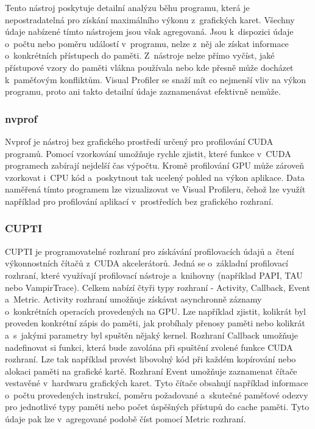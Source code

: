 Tento nástroj poskytuje detailní analýzu běhu programu, která je nepostradatelná pro získání maximálního výkonu z~grafických karet. Všechny údaje nabízené tímto nástrojem jsou však agregovaná. Jsou k~dispozici údaje o~počtu nebo poměru událostí v~programu, nelze z~něj ale získat informace o~konkrétních přístupech do paměti. Z~nástroje nelze přímo vyčíst, jaké přístupové vzory do paměti vlákna používala nebo kde přesně může docházet k~paměťovým konfliktům. 
Visual Profiler se snaží mít co nejmenší vliv na výkon programu, proto ani takto detailní údaje zaznamenávat efektivně nemůže.


\subsubsection{nvprof}
Nvprof je nástroj bez grafického prostředí určený pro profilování CUDA programů. Pomocí vzorkování umožňuje rychle zjistit, které funkce v~CUDA programech zabírají nejdelší čas výpočtu. Kromě profilování GPU může zároveň vzorkovat i~CPU kód a~poskytnout tak ucelený pohled na výkon aplikace. Data naměřená tímto programem lze vizualizovat ve Visual Profileru, čehož lze využít například pro profilování aplikací v~prostředích bez grafického rozhraní. 

\subsubsection{CUPTI}
CUPTI je programovatelné rozhraní pro získávání profilovacích údajů a~čtení výkonnostních čítačů z~CUDA akcelerátorů. Jedná se o~základní profilovací rozhraní, které využívají profilovací nástroje a~knihovny (například PAPI, TAU nebo VampirTrace).
Celkem nabízí čtyři typy rozhraní - Activity, Callback, Event a~Metric. Activity rozhraní umožňuje získávat asynchronně záznamy o~konkrétních operacích provedených na GPU. Lze například zjistit, kolikrát byl proveden konkrétní zápis do paměti, jak probíhaly přenosy paměti nebo kolikrát a~s~jakými parametry byl spuštěn nějaký kernel. Rozhraní Callback umožňuje nadefinovat si funkci, která bude zavolána při spuštění zvolené funkce CUDA rozhraní. Lze tak například provést libovolný kód při každém kopírování nebo alokaci paměti na grafické kartě. Rozhraní Event umožňuje zaznamenat čítače vestavěné v~hardwaru grafických karet. Tyto čítače obsahují například informace o~počtu provedených instrukcí, poměru požadované a~skutečné paměťové odezvy pro jednotlivé typy paměti nebo počet úspěšných přístupů do cache paměti. Tyto údaje pak lze v~agregované podobě číst pomocí Metric rozhraní.

